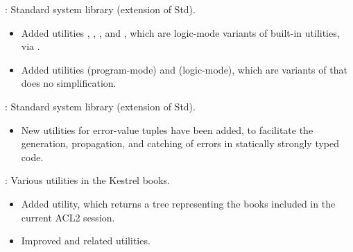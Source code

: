
\begin{frame}

\implibtitle

:
Standard system library (extension of Std).
\begin{itemize}
\item Added utilities
      ,
      ,
      , and
      ,
      which are logic-mode variants of built-in utilities,
      via .
\item Added utilities
       (program-mode) and
       (logic-mode),
      which are variants of  that does no simplification.
\end{itemize}

\end{frame}


\begin{frame}

\implibtitle

:
Standard system library (extension of Std).
\begin{itemize}
\item New utilities for error-value tuples have been added,
      to facilitate the generation, propagation, and catching of errors
      in statically strongly typed code.
\end{itemize}

\end{frame}


\begin{frame}

\implibtitle

:
Various utilities in the Kestrel books.
\begin{itemize}
\item Added  utility,
      which returns a tree representing
      the books included in the current ACL2 session.
\item Improved  and related utilities.
\end{itemize}

\end{frame}


